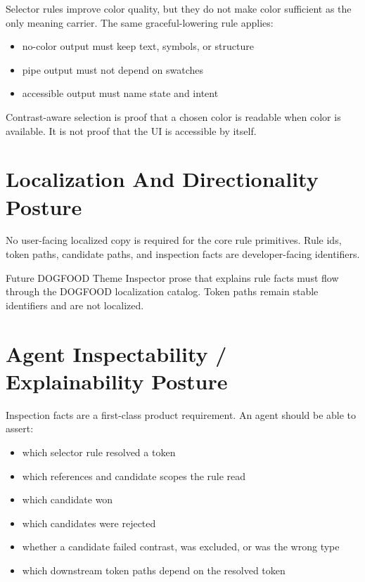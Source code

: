 Selector rules improve color quality, but they do not make color sufficient as the only meaning carrier. The same graceful-lowering rule applies:

\begin{itemize}
\tightlist
\item
  no-color output must keep text, symbols, or structure
\item
  pipe output must not depend on swatches
\item
  accessible output must name state and intent
\end{itemize}

Contrast-aware selection is proof that a chosen color is readable when color is available. It is not proof that the UI is accessible by itself.

\section{Localization And Directionality Posture}\label{record-184-localization-and-directionality-posture}

No user-facing localized copy is required for the core rule primitives. Rule ids, token paths, candidate paths, and inspection facts are developer-facing identifiers.

Future DOGFOOD Theme Inspector prose that explains rule facts must flow through the DOGFOOD localization catalog. Token paths remain stable identifiers and are not localized.

\section{Agent Inspectability / Explainability Posture}\label{record-184-agent-inspectability-explainability-posture}

Inspection facts are a first-class product requirement. An agent should be able to assert:

\begin{itemize}
\tightlist
\item
  which selector rule resolved a token
\item
  which references and candidate scopes the rule read
\item
  which candidate won
\item
  which candidates were rejected
\item
  whether a candidate failed contrast, was excluded, or was the wrong type
\item
  which downstream token paths depend on the resolved token
\end{itemize}

